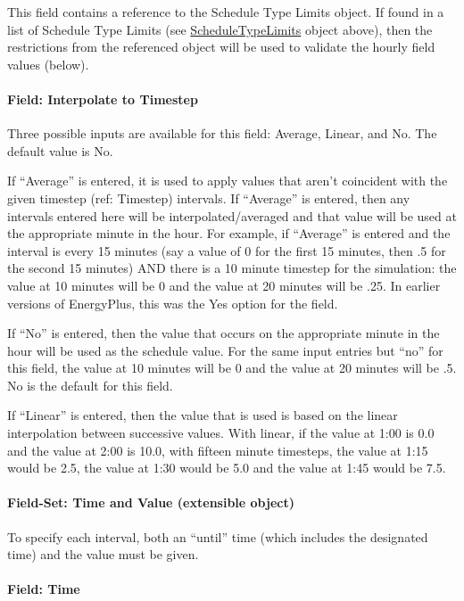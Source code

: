 This field contains a reference to the Schedule Type Limits object. If found in a list of Schedule Type Limits (see \hyperref[scheduletypelimits]{ScheduleTypeLimits} object above), then the restrictions from the referenced object will be used to validate the hourly field values (below).

\paragraph{Field: Interpolate to Timestep}\label{field-interpolate-to-timestep}

Three possible inputs are available for this field: Average, Linear, and No. The default value is No.

If ``Average'' is entered, it is used to apply values that aren't coincident with the given timestep (ref: Timestep) intervals. If ``Average'' is entered, then any intervals entered here will be interpolated/averaged and that value will be used at the appropriate minute in the hour. For example, if ``Average'' is entered and the interval is every 15 minutes (say a value of 0 for the first 15 minutes, then .5 for the second 15 minutes) AND there is a 10 minute timestep for the simulation: the value at 10 minutes will be 0 and the value at 20 minutes will be .25. In earlier versions of EnergyPlus, this was the Yes option for the field.

If ``No'' is entered, then the value that occurs on the appropriate minute in the hour will be used as the schedule value. For the same input entries but ``no'' for this field, the value at 10 minutes will be 0 and the value at 20 minutes will be .5. No is the default for this field.

If ``Linear'' is entered, then the value that is used is based on the linear interpolation between successive values. With linear, if the value at 1:00 is 0.0 and the value at 2:00 is 10.0, with fifteen minute timesteps, the value at 1:15 would be 2.5, the value at 1:30 would be 5.0 and the value at 1:45 would be 7.5.

\paragraph{Field-Set: Time and Value (extensible object)}\label{field-set-time-and-value-extensible-object}

To specify each interval, both an ``until'' time (which includes the designated time) and the value must be given.

\paragraph{Field: Time}\label{field-time}

